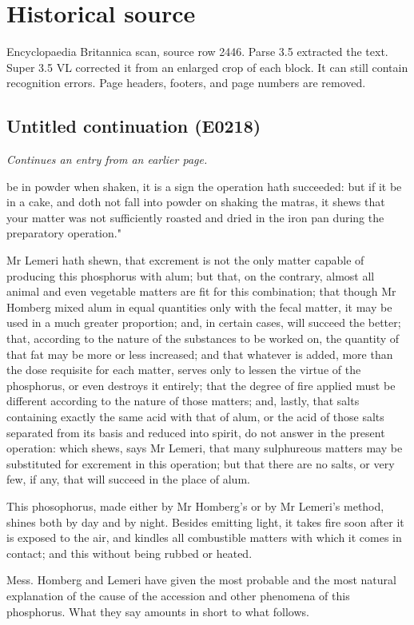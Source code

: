 \documentclass{article}
\begin{document}
\section*{Historical source}
Encyclopaedia Britannica scan, source row 2446. Parse 3.5 extracted the text. Super 3.5 VL corrected it from an enlarged crop of each block. It can still contain recognition errors.
Page headers, footers, and page numbers are removed.

\subsection*{Untitled continuation (E0218)}
\textit{Continues an entry from an earlier page.}

be in powder when shaken, it is a sign the operation hath succeeded: but if it be in a cake, and doth not fall into powder on shaking the matras, it shews that your matter was not sufficiently roasted and dried in the iron pan during the preparatory operation."

Mr Lemeri hath shewn, that excrement is not the only matter capable of producing this phosphorus with alum; but that, on the contrary, almost all animal and even vegetable matters are fit for this combination; that though Mr Homberg mixed alum in equal quantities only with the fecal matter, it may be used in a much greater proportion; and, in certain cases, will succeed the better; that, according to the nature of the substances to be worked on, the quantity of that fat may be more or less increased; and that whatever is added, more than the dose requisite for each matter, serves only to lessen the virtue of the phosphorus, or even destroys it entirely; that the degree of fire applied must be different according to the nature of those matters; and, lastly, that salts containing exactly the same acid with that of alum, or the acid of those salts separated from its basis and reduced into spirit, do not answer in the present operation: which shews, says Mr Lemeri, that many sulphureous matters may be substituted for excrement in this operation; but that there are no salts, or very few, if any, that will succeed in the place of alum.

This phosophorus, made either by Mr Homberg's or by Mr Lemeri's method, shines both by day and by night. Besides emitting light, it takes fire soon after it is exposed to the air, and kindles all combustible matters with which it comes in contact; and this without being rubbed or heated.

Mess. Homberg and Lemeri have given the most probable and the most natural explanation of the cause of the accession and other phenomena of this phosphorus. What they say amounts in short to what follows.
\end{document}
